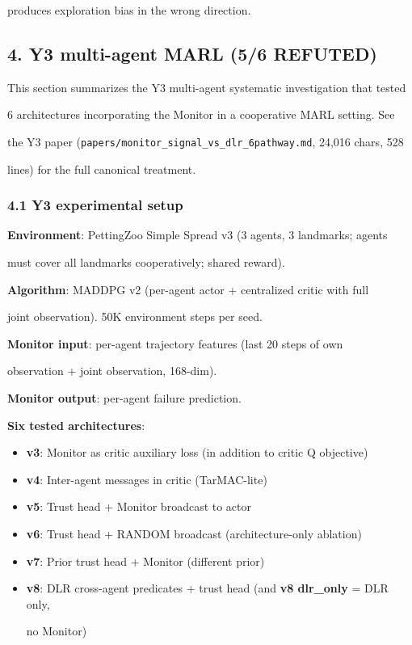 \documentclass[11pt]{article}
\begin{document}
produces exploration bias in the wrong direction.

\subsection{4. Y3 multi-agent MARL (5/6
REFUTED)}\label{y3-multi-agent-marl-56-refuted}

This section summarizes the Y3 multi-agent systematic investigation that
tested

6 architectures incorporating the Monitor in a cooperative MARL setting.
See

the Y3 paper (\texttt{papers/monitor\_signal\_vs\_dlr\_6pathway.md},
24,016 chars, 528

lines) for the full canonical treatment.

\subsubsection{4.1 Y3 experimental setup}\label{y3-experimental-setup}

\textbf{Environment}: PettingZoo Simple Spread v3 (3 agents, 3
landmarks; agents

must cover all landmarks cooperatively; shared reward).

\textbf{Algorithm}: MADDPG v2 (per-agent actor + centralized critic with
full

joint observation). 50K environment steps per seed.

\textbf{Monitor input}: per-agent trajectory features (last 20 steps of
own

observation + joint observation, 168-dim).

\textbf{Monitor output}: per-agent failure prediction.

\textbf{Six tested architectures}:

\begin{itemize}
\item
  \textbf{v3}: Monitor as critic auxiliary loss (in addition to critic Q
  objective)
\item
  \textbf{v4}: Inter-agent messages in critic (TarMAC-lite)
\item
  \textbf{v5}: Trust head + Monitor broadcast to actor
\item
  \textbf{v6}: Trust head + RANDOM broadcast (architecture-only
  ablation)
\item
  \textbf{v7}: Prior trust head + Monitor (different prior)
\item
  \textbf{v8}: DLR cross-agent predicates + trust head (and \textbf{v8
  dlr\_only} = DLR only,

  no Monitor)
\end{itemize}
\end{document}
